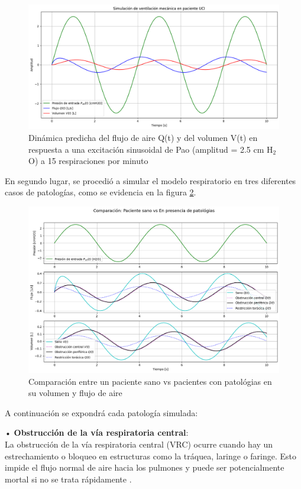 \documentclass[journal]{IEEEtran}
\begin{document}
\begin{figure}[h!]
    \centering
    \includegraphics[width=1\linewidth]{Comportamiento-Practica1}
    \caption{Dinámica predicha del flujo de aire Q(t) y del volumen V(t) en respuesta a una excitación sinusoidal de Pao (amplitud = 2.5 cm H$_2$O) a 15 respiraciones por minuto}
    \label{fig:simulacion_normal}
\end{figure}

En segundo lugar, se procedió a simular el modelo respiratorio en tres diferentes casos de patologías, como se evidencia en la figura \ref{fig:comparacion}. 

\begin{figure}[H]
    \centering
    \includegraphics[width=1\linewidth]{Comparacion_Prac1.png}
    \caption{Comparación entre un paciente sano vs pacientes con patológias en su volumen y flujo de aire}
    \label{fig:comparacion}
\end{figure}

A continuación se expondrá cada patología simulada:\bigskip

•	\textbf{Obstrucción de la vía respiratoria central}:\\
La obstrucción de la vía respiratoria central (VRC) ocurre cuando hay un estrechamiento o bloqueo en estructuras como la tráquea, laringe o faringe. Esto impide el flujo normal de aire hacia los pulmones y puede ser potencialmente mortal si no se trata rápidamente \cite{mountsinai2023}. 
\end{document}
